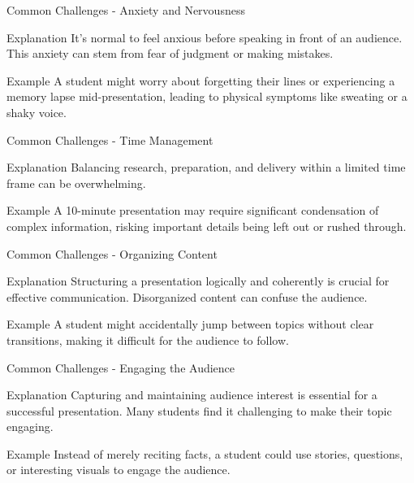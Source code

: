 \documentclass[aspectratio=169]{beamer}
\begin{document}
\begin{frame}[fragile]{Common Challenges - Anxiety and Nervousness}
    \begin{block}{Explanation}
        It’s normal to feel anxious before speaking in front of an audience. This anxiety can stem from fear of judgment or making mistakes.
    \end{block}
    \begin{block}{Example}
        A student might worry about forgetting their lines or experiencing a memory lapse mid-presentation, leading to physical symptoms like sweating or a shaky voice.
    \end{block}
\end{frame}

\begin{frame}[fragile]{Common Challenges - Time Management}
    \begin{block}{Explanation}
        Balancing research, preparation, and delivery within a limited time frame can be overwhelming.
    \end{block}
    \begin{block}{Example}
        A 10-minute presentation may require significant condensation of complex information, risking important details being left out or rushed through.
    \end{block}
\end{frame}

\begin{frame}[fragile]{Common Challenges - Organizing Content}
    \begin{block}{Explanation}
        Structuring a presentation logically and coherently is crucial for effective communication. Disorganized content can confuse the audience.
    \end{block}
    \begin{block}{Example}
        A student might accidentally jump between topics without clear transitions, making it difficult for the audience to follow.
    \end{block}
\end{frame}

\begin{frame}[fragile]{Common Challenges - Engaging the Audience}
    \begin{block}{Explanation}
        Capturing and maintaining audience interest is essential for a successful presentation. Many students find it challenging to make their topic engaging.
    \end{block}
    \begin{block}{Example}
        Instead of merely reciting facts, a student could use stories, questions, or interesting visuals to engage the audience.
    \end{block}
\end{frame}
\end{document}
